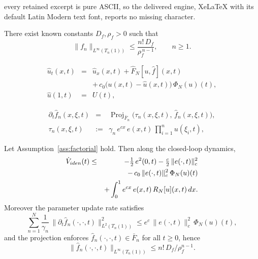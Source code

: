 \documentclass[10pt,a4paper]{amsart}
\DeclareMathOperator{\Proj}{Proj}
\begin{document}
every retained excerpt is pure ASCII, so the delivered engine, XeLaTeX with its default Latin Modern text font, reports no missing character.
\begin{assumption}\label{ass:factorial}
There exist known constants $D_f,\rho_f>0$ such that
\begin{equation}\label{eq:factorial}
\|f_n\|_{L^\infty(T_n(1))}\le \frac{n!\,D_f}{\rho_f^{\,n-1}},\qquad n\ge 1.
\end{equation}
\end{assumption}

\begin{eqnarray}
\hat u_t(x,t) &=& \hat u_x(x,t) + \hat F_N[u,\hat f](x,t) \nonumber\\
&& +\, c_0\bigl(u(x,t)-\hat u(x,t)\bigr)\,\Phi_N(u)(t), \label{eq:obs1-N}\\
\hat u(1,t) &=& U(t), \label{eq:obs2-N}
\end{eqnarray}

\begin{eqnarray}
\partial_t\hat f_n(x,\xi,t) &=& \Proj_{\bar F_n}\!\bigl(\tau_n(x,\xi,t),\,\hat f_n(x,\xi,t)\bigr), \label{eq:upd1-N}\\
\tau_n(x,\xi,t) &:=& \gamma_n\,e^{cx}\,e(x,t)\,\prod_{i=1}^n u(\xi_i,t), \label{eq:upd2-N}
\end{eqnarray}

\begin{lemma}\label{lem:Vdot-N}
Let Assumption~\ref{ass:factorial} hold. Then along the closed-loop dynamics,
\begin{eqnarray}
\dot V_{\rm iden}(t) &\le& -\tfrac12\,e^2(0,t)-\tfrac{c}{2}\,\|e(\cdot,t)\|_c^2 \nonumber\\
&& -\,c_0\,\|e(\cdot,t)\|_c^2\,\Phi_N(u)(t) \nonumber\\
&& +\int_0^1 e^{cx}\,e(x,t)\,R_N[u](x,t)\,dx. \label{eq:Vdot-N}
\end{eqnarray}
Moreover the parameter update rate satisfies
\begin{equation}\label{eq:P4-N}
\sum_{n=1}^N\frac{1}{\gamma_n}\,\|\partial_t\hat f_n(\cdot,\cdot,t)\|^2_{L^2(T_n(1))}\le e^c\,\|e(\cdot,t)\|_c^2\,\Phi_N(u)(t),
\end{equation}
and the projection enforces $\hat f_n(\cdot,\cdot,t)\in \bar F_n$ for all $t\ge 0$, hence
\begin{equation}\label{eq:P1-N}
\|\hat f_n(\cdot,\cdot,t)\|_{L^\infty(T_n(1))}\le n!\,D_f/\rho_f^{n-1}.
\end{equation}
\end{lemma}
\end{document}
